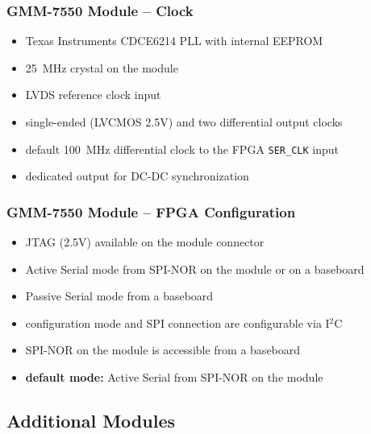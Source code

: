\begin{frame}
  \frametitle{GMM-7550 Module -- Clock}
  \begin{itemize}
  \item Texas Instruments CDCE6214 PLL with internal EEPROM
  \item 25~MHz crystal on the module
  \item LVDS reference clock input
  \item single-ended (LVCMOS 2.5V) and two differential output clocks
  \item default 100~MHz differential clock to the FPGA \texttt{SER\_CLK} input
  \item dedicated output for DC-DC synchronization
  \end{itemize}
\end{frame}

\begin{frame}
  \frametitle{GMM-7550 Module -- FPGA Configuration}
  \begin{itemize}
  \item JTAG (2.5V) available on the module connector
  \item Active Serial mode from SPI-NOR on the module or on a
  baseboard
  \item Passive Serial mode from a baseboard
  \item configuration mode and SPI connection are configurable via I$^2$C
  \item SPI-NOR on the module is accessible from a baseboard
  \item \textbf{default mode:} Active Serial from SPI-NOR on the module
  \end{itemize}
\end{frame}

\subsection{Additional Modules}

